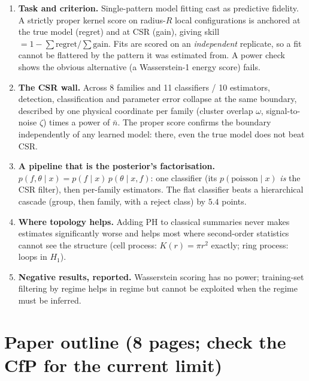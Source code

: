 \documentclass[11pt]{article}
\newcommand{\nb}{\bar n}
\begin{document}
\begin{enumerate}
  \item \textbf{Task and criterion.} Single-pattern model fitting cast as predictive fidelity. A strictly
    proper kernel score on radius-$R$ local configurations is anchored at the true model (regret) and at CSR
    (gain), giving skill $=1-\sum\text{regret}/\sum\text{gain}$. Fits are scored on an \emph{independent}
    replicate, so a fit cannot be flattered by the pattern it was estimated from. A power check shows the obvious
    alternative (a Wasserstein-1 energy score) fails.
  \item \textbf{The CSR wall.} Across 8 families and 11 classifiers / 10 estimators, detection, classification
    and parameter error collapse at the same boundary, described by one physical coordinate per family (cluster
    overlap $\omega$, signal-to-noise $\zeta$) times a power of $\nb$. The proper score confirms the boundary
    independently of any learned model: there, even the true model does not beat CSR.
  \item \textbf{A pipeline that is the posterior's factorisation.} $p(f,\theta\mid x)=p(f\mid x)\,p(\theta\mid x,f)$:
    one classifier (its $p(\text{poisson}\mid x)$ \emph{is} the CSR filter), then per-family estimators. The flat
    classifier beats a hierarchical cascade (group, then family, with a reject class) by $5.4$ points.
  \item \textbf{Where topology helps.} Adding PH to classical summaries never makes estimates significantly
    worse and helps most where second-order statistics cannot see the structure (cell process: $K(r)=\pi r^2$
    exactly; ring process: loops in $H_1$).
  \item \textbf{Negative results, reported.} Wasserstein scoring has no power; training-set filtering by regime
    helps in regime but cannot be exploited when the regime must be inferred.
\end{enumerate}

\section*{Paper outline (8 pages; check the CfP for the current limit)}
\end{document}
